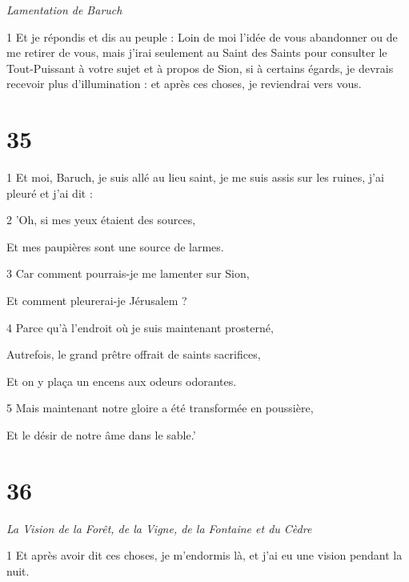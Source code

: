 \par \textit{Lamentation de Baruch}

\par 1 Et je répondis et dis au peuple : Loin de moi l'idée de vous abandonner ou de me retirer de vous, mais j'irai seulement au Saint des Saints pour consulter le Tout-Puissant à votre sujet et à propos de Sion, si à certains égards, je devrais recevoir plus d'illumination : et après ces choses, je reviendrai vers vous.

\chapter{35}

\par 1 Et moi, Baruch, je suis allé au lieu saint, je me suis assis sur les ruines, j'ai pleuré et j'ai dit :

\par 2 'Oh, si mes yeux étaient des sources,

\par Et mes paupières sont une source de larmes.

\par 3 Car comment pourrais-je me lamenter sur Sion,

\par Et comment pleurerai-je Jérusalem ?

\par 4 Parce qu'à l'endroit où je suis maintenant prosterné,

\par Autrefois, le grand prêtre offrait de saints sacrifices,

\par Et on y plaça un encens aux odeurs odorantes.

\par 5 Mais maintenant notre gloire a été transformée en poussière,

\par Et le désir de notre âme dans le sable.'

\chapter{36}

\par \textit{La Vision de la Forêt, de la Vigne, de la Fontaine et du Cèdre}

\par 1 Et après avoir dit ces choses, je m'endormis là, et j'ai eu une vision pendant la nuit.


